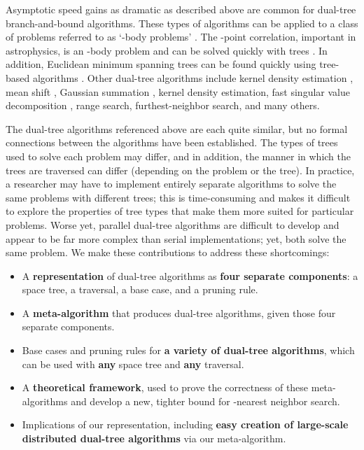 \documentclass{article}
\begin{document}
Asymptotic speed gains as dramatic as described above are common for dual-tree
branch-and-bound algorithms.  These types of algorithms can be applied to a
class of problems referred to as `-body problems' \cite{nbody}.  The
-point correlation, important in astrophysics, is an -body problem and can
be solved quickly with trees \cite{march2012}.  In addition, Euclidean minimum
spanning trees can be found quickly using tree-based algorithms
\cite{march2010}.  Other dual-tree algorithms include kernel density estimation
\cite{gray2003}, mean shift \cite{wang2007}, Gaussian summation \cite{lee2006},
kernel density estimation, fast singular value decomposition
\cite{holmes2008quic}, range search, furthest-neighbor search, and many others.


The dual-tree algorithms referenced above are each quite similar, but no formal
connections between the algorithms have been established.  The
types of trees used to solve each problem may differ, and in addition, the
manner in which the trees are traversed can differ (depending on the
problem or the tree).  In practice, a researcher may have to
implement entirely separate algorithms to solve the same problems with different
trees; this is time-consuming and makes it difficult to explore the
properties of tree types that make them more suited for particular problems.
Worse yet, parallel dual-tree algorithms are difficult to
develop and appear to be far more complex than serial implementations; yet, both
solve the same problem.  We make these contributions to address these
shortcomings:


\begin{itemize}
  \vspace*{-1em}
  \item A {\bf representation} of dual-tree algorithms as {\bf four separate
components}: a space tree, a traversal, a base case, and a pruning rule.
  \vspace*{-0.5em}
  \item A {\bf meta-algorithm} that produces dual-tree algorithms, given those
four separate components.
  \vspace*{-1.5em}
  \item Base cases and pruning rules for {\bf a variety of dual-tree
algorithms}, which can be used with \textbf{any} space tree and \textbf{any}
traversal.
  \vspace*{-0.5em}
  \item A {\bf theoretical framework}, used to prove the correctness of these
meta-algorithms and develop a new, tighter bound for -nearest neighbor
search.
  \vspace*{-0.5em}

  \item Implications of our representation, including {\bf easy creation of
large-scale distributed dual-tree algorithms} via our meta-algorithm.


\end{itemize}
\end{document}
